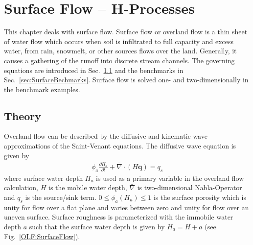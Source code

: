 \chapter{Surface Flow -- H-Processes}
\label{sec:Surface}
%
This chapter deals with surface flow. Surface flow or overland flow is a thin sheet of water flow which occurs when soil is infiltrated to full capacity and excess water, from rain, snowmelt, or other sources flows over the land. Generally, it causes a gathering of the runoff into discrete stream channels. The governing equations are introduced in Sec.~\ref{sec:SurfaceTheory} and the benchmarks in Sec.~\ref{sec:SurfaceBechmarks}. Surface flow is solved one- and two-dimensionally in the benchmark examples.
%
\section{Theory}
\label{sec:SurfaceTheory}
%
Overland flow can be described by the diffusive and kinematic wave approximations of the Saint-Venant equations. The diffusive wave equation \cite{Therrien:04} is given by 
\begin{eqnarray}
\phi_a\frac{\partial H_a}{\partial t} + \bar\nabla\cdot \left( H \mathbf q \right) = q_s
\label{eqn:OLF_Governing}
\end{eqnarray}
%
where surface water depth $H_a$ is used as a primary variable in the overland flow calculation, $H$ is the mobile water depth, $\bar\nabla$ is two-dimensional Nabla-Operator and $q_s$ is the source/sink term. $0 \leq \phi_a(H_a) \leq 1$ is the surface porosity which is unity for flow over a flat plane and varies between zero and unity for flow over an uneven surface. Surface roughness is parameterized with the immobile water depth $a$ such that the surface water depth is given by  $H_a = H + a$ (see Fig.~\ref{OLF:SurfaceFlow}).

